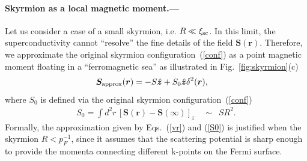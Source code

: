 \documentclass[twocolumn,showpacs,floatfix,longbibliography]{revtex4-1}
\begin{document}
\paragraph*{Skyrmion as a local magnetic moment.---} \label{sec:analytics}
Let us consider a case of a small skyrmion, i.e. $R\ll\xi_{\rm sc}$. In this limit, the superconductivity cannot ``resolve'' the fine details of the field $\bm S(\bm r)$. Therefore, we approximate the original skyrmion configuration~(\ref{conf}) as a point magnetic moment floating in a ``ferromagnetic sea'' as illustrated in Fig.~\ref{fig:skyrmion}(c)
\begin{align}
	\bm S_{\rm approx}(\bm r) & =  - S \hat{\bm z} + S_0 \hat{\bm z} \delta^2(\bm r),  \label{vr}
\end{align}
where $S_0$ is defined via the original skyrmion configuration~(\ref{conf})
\begin{align}
	S_0 = \int  d^2r \, \left[\bm S(\bm r)-\bm S(\infty)\right]_z  \quad \sim \,\,\,SR^2. \label{S0} 
\end{align}
Formally, the approximation given by Eqs.~(\ref{vr}) and (\ref{S0}) is justified when the skyrmion $R<p_F^{-1}$, since it assumes that the scattering potential is sharp enough to provide the momenta connecting different k-points on the Fermi surface. 
\end{document}

